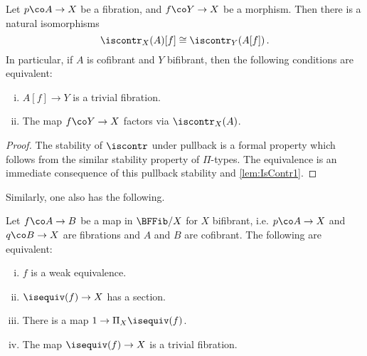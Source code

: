 \begin{lemma} \label{lem:isContr2}
Let $p \co A \to X$ be a fibration, and $f \co Y \rightarrow X$ be a morphism. Then there is a natural isomorphisms
\[ 
 \iscontr_X(A) [f]  \cong \iscontr_Y(A[f])  \, .
\]
In particular, if $A$ is cofibrant and $Y$ bifibrant, then the following conditions are equivalent: 
\begin{enumerate}[(i)] 
\item $A[f] \to Y$ is a trivial fibration.
\item The map $f \co Y \rightarrow X$ factors via $\iscontr_X(A)$.
\end{enumerate}
\end{lemma}

\begin{proof} The stability of $\iscontr$ under pullback is a formal property which follows from the similar stability property of $\Pi$-types. The equivalence is an immediate consequence of this pullback stability and \cref{lem:IsContr1}.
\end{proof}


Similarly, one also has the following.

\begin{lemma} \label{isEquiv1} Let $f \co A \rightarrow B$ be a map in $\BFFib/X$ for $X$ bifibrant, i.e. $p \co A \to X$ and $q \co B \to X$ are fibrations and $A$ and $B$ are cofibrant. The following are equivalent:
\begin{enumerate}[(i)]
\item $f$ is a weak equivalence.
\item $\isequiv(f) \to X$ has a section.
\item There is a map $1 \rightarrow \Pi_X \isequiv(f)$.
\item The map $\isequiv(f) \to X$ is a trivial fibration.
\end{enumerate}
\end{lemma}



